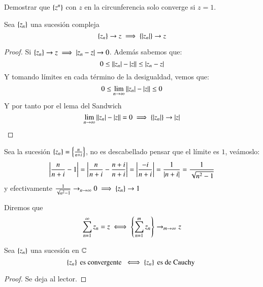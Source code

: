     \begin{th_ex}
        Demostrar que $\left\{z^n\right\}$ con $z$ en la circunferencia solo converge si $z = 1$.
    \end{th_ex}

    \begin{pro}
        Sea $\left\{z_n\right\}$ una sucesión compleja
        $$
            \left\{z_n\right\} \to z \implies \left\{\left|z_n\right|\right\} \to z
        $$
    \end{pro}
    \begin{proof}
        Si $\left\{z_n\right\} \to z \implies \left|z_n - z\right| \to 0$. Además sabemos que:
        $$
            0 \leq \left|\left|z_n\right| - \left|z\right|\right| \leq \left|z_n - z\right|
        $$
        Y tomando límites en cada término de la desigualdad, vemos que:
        $$
            0 \leq \lim_{n \to \infty} \left|\left|z_n\right| - \left|z\right|\right| \leq 0
        $$
        Y por tanto por el lema del Sandwich
        $$
        \lim_{n \to \infty} \left|\left|z_n\right| - \left|z\right|\right| = 0 \implies \left\{\left|z_n\right|\right\} \to \left|z\right|
        $$
    \end{proof}

    \begin{eg}
        Sea la sucesión $\left\{z_n\right\} = \left\{\frac{n}{n+i}\right\}$, no es descabellado pensar que el límite es $1$, veámoslo:
        $$
            \left|\frac{n}{n+i} - 1\right| = \left|\frac{n}{n+i} - \frac{n+i}{n+i}\right| = \left|\frac{-i}{n+i}\right| = \frac{1}{\left|n+i\right|} = \frac{1}{\sqrt{n^2-1}}
        $$
        y efectivamente $\frac{1}{\sqrt{n^2-1}} \to_{n\to\infty} 0 \implies \left\{z_n\right\} \to 1$
    \end{eg}

    \begin{obs}
        Diremos que $$\sum_{n=1}^{\infty}  z_n = z \iff \left\{\sum_{n=1}^{m} z_n\right\} \to_{m\to\infty} z$$
    \end{obs}

    \begin{pro}
        Sea $\left\{z_n\right\}$ una sucesión en $\mathbb{C}$
        $$
            \left\{z_n\right\} \text{ es convergente } \iff \left\{z_n\right\} \text{ es de Cauchy }
        $$
    \end{pro}
    \begin{proof}
        Se deja al lector.
    \end{proof}

